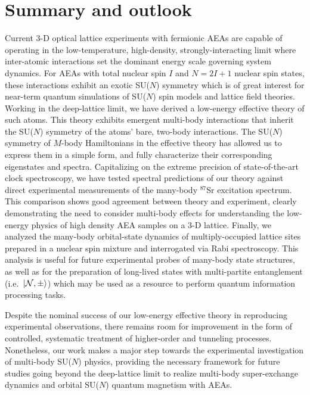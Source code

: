 \documentclass[preprint,showkeys,nofootinbib]{revtex4-1}
\newcommand{\N}{\mathcal{N}}
\newcommand{\1}{\mathds{1}}
\begin{document}
\section{Summary and outlook}
\label{sec:summary}

Current 3-D optical lattice experiments with fermionic AEAs are
capable of operating in the low-temperature, high-density,
strongly-interacting limit where inter-atomic interactions set the
dominant energy scale governing system dynamics.  For AEAs with total
nuclear spin $I$ and $N=2I+1$ nuclear spin states, these interactions
exhibit an exotic SU($N$) symmetry which is of great interest for
near-term quantum simulations of SU($N$) spin models and lattice field
theories.  Working in the deep-lattice limit, we have derived a
low-energy effective theory of such atoms.  This theory exhibits
emergent multi-body interactions that inherit the SU($N$) symmetry of
the atoms' bare, two-body interactions.  The SU($N$) symmetry of
$M$-body Hamiltonians in the effective theory has allowed us to
express them in a simple form, and fully characterize their
corresponding eigenstates and spectra.  Capitalizing on the extreme
precision of state-of-the-art clock spectroscopy, we have tested
spectral predictions of our theory against direct experimental
measurements of the many-body ${}^{87}$Sr excitation spectrum.  This
comparison shows good agreement between theory and experiment, clearly
demonstrating the need to consider multi-body effects for
understanding the low-energy physics of high density AEA samples on a
3-D lattice.  Finally, we analyzed the many-body orbital-state
dynamics of multiply-occupied lattice sites prepared in a nuclear spin
mixture and interrogated via Rabi spectroscopy.  This analysis is
useful for future experimental probes of many-body state structures,
as well as for the preparation of long-lived states with multi-partite
entanglement (i.e.~$\ket{\N,\pm}$) which may be used as a resource to
perform quantum information processing tasks.

Despite the nominal success of our low-energy effective theory in
reproducing experimental observations, there remains room for
improvement in the form of controlled, systematic treatment of
higher-order and tunneling processes.
Nonetheless, our work makes a major step towards the experimental
investigation of multi-body SU($N$) physics, providing the necessary
framework for future studies going beyond the deep-lattice limit to
realize multi-body super-exchange dynamics and orbital SU($N$) quantum
magnetism with AEAs.
\end{document}
